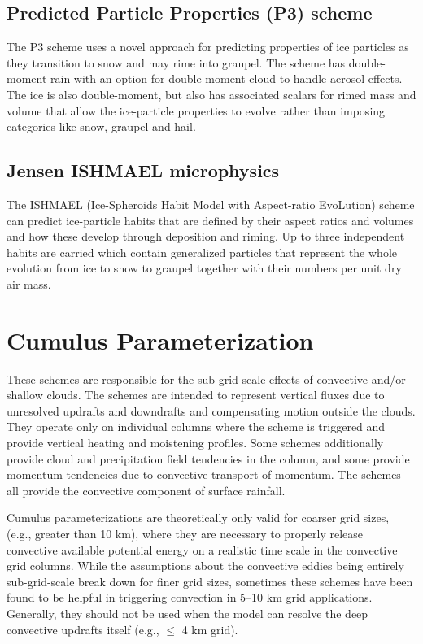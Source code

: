 \subsection {Predicted Particle Properties (P3) scheme}
The P3 scheme \citep{morrison15} uses a novel approach for predicting properties of ice particles as they transition to
snow and may rime into graupel. The scheme has double-moment rain with an option for double-moment cloud to
handle aerosol effects. The ice is also double-moment, but also has associated scalars for rimed mass and volume that
allow the ice-particle properties to evolve rather than imposing categories like snow, graupel and hail.

\subsection {Jensen ISHMAEL microphysics}
The ISHMAEL (Ice-Spheroids Habit Model with Aspect-ratio EvoLution) scheme \citep{jensen17} can predict ice-particle habits
that are defined by their aspect ratios and volumes and how these develop through deposition and riming. Up to three independent
habits are carried which contain generalized particles that represent the whole evolution from ice to snow to graupel together with their numbers
per unit dry air mass.


\section{Cumulus Parameterization}

These schemes are responsible for the sub-grid-scale effects of 
convective and/or shallow clouds. The schemes are intended to 
represent vertical fluxes due to unresolved updrafts and 
downdrafts and compensating motion outside the clouds. They 
operate only on individual columns where the scheme is triggered and 
provide vertical heating and moistening profiles. Some schemes 
additionally provide cloud and precipitation field tendencies 
in the column, and some provide momentum tendencies 
due to convective transport of momentum. The schemes all provide 
the convective component of surface rainfall.

Cumulus parameterizations are theoretically only valid for coarser grid sizes,
(e.g., greater than 10 km), where they are necessary to properly
release convective available potential energy on a realistic time scale in the convective grid columns.
While the assumptions about the convective eddies being entirely
sub-grid-scale break down for finer grid sizes, sometimes these
schemes have been found to be helpful in triggering convection in
5--10 km grid applications. Generally, they should not be used when
the model can resolve the deep convective updrafts itself (e.g., $\le$ 4 km grid).

